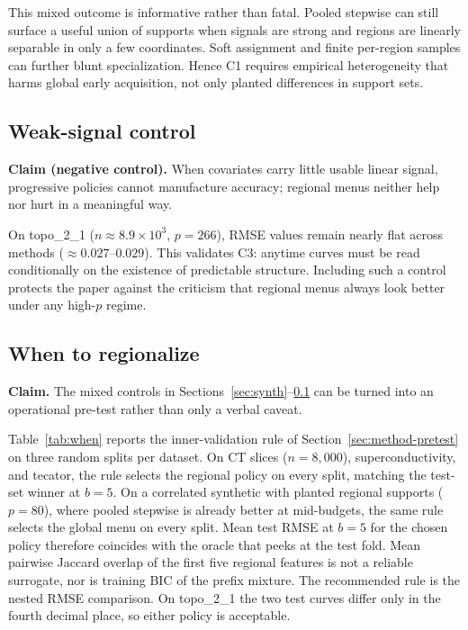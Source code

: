 \documentclass[pdflatex,sn-basic,Numbered]{sn-jnl}
\begin{document}
This mixed outcome is informative rather than fatal. Pooled stepwise can still surface a useful union of supports when signals are strong and regions are linearly separable in only a few coordinates. Soft assignment and finite per-region samples can further blunt specialization. Hence C1 requires empirical heterogeneity that harms global early acquisition, not only planted differences in support sets.

\subsection{Weak-signal control}
\label{sec:topo}

\textbf{Claim (negative control).} When covariates carry little usable linear signal, progressive policies cannot manufacture accuracy; regional menus neither help nor hurt in a meaningful way.

On topo\_2\_1 (\(n\approx 8.9\times 10^3\), \(p=266\)), RMSE values remain nearly flat across methods (\(\approx 0.027\)--\(0.029\)). This validates C3: anytime curves must be read conditionally on the existence of predictable structure. Including such a control protects the paper against the criticism that regional menus always look better under any high-\(p\) regime.

\subsection{When to regionalize}
\label{sec:when}
\textbf{Claim.} The mixed controls in Sections~\ref{sec:synth}--\ref{sec:topo} can be turned into an operational pre-test rather than only a verbal caveat.

Table~\ref{tab:when} reports the inner-validation rule of Section~\ref{sec:method-pretest} on three random splits per dataset. On CT slices (\(n=8{,}000\)), superconductivity, and tecator, the rule selects the regional policy on every split, matching the test-set winner at \(b=5\). On a correlated synthetic with planted regional supports (\(p=80\)), where pooled stepwise is already better at mid-budgets, the same rule selects the global menu on every split. Mean test RMSE at \(b=5\) for the chosen policy therefore coincides with the oracle that peeks at the test fold. Mean pairwise Jaccard overlap of the first five regional features is not a reliable surrogate, nor is training BIC of the prefix mixture. The recommended rule is the nested RMSE comparison. On topo\_2\_1 the two test curves differ only in the fourth decimal place, so either policy is acceptable.
\end{document}
